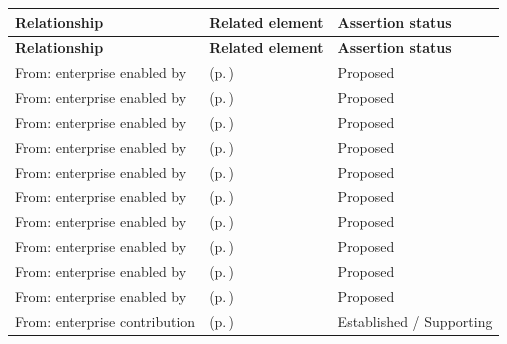 \begingroup\small\setlength{\TableWidth}{\dimexpr\linewidth-6\tabcolsep-4\arrayrulewidth\relax}
\begin{longtable}{|>{\raggedright\arraybackslash}p{0.27\TableWidth}|>{\raggedright\arraybackslash}p{0.48\TableWidth}|>{\raggedright\arraybackslash}p{0.25\TableWidth}|}
\hline\rowcolor{TableHead}\textbf{Relationship} & \textbf{Related element} & \textbf{Assertion status}\\\hline\endfirsthead
\hline\rowcolor{TableHead}\textbf{Relationship} & \textbf{Related element} & \textbf{Assertion status}\\\hline\endhead
\hline\endfoot
From: enterprise enabled by & \nameref{cap:bec-referral-administration} (p.\,\pageref{cap:bec-referral-administration}) & Proposed\\\hline
From: enterprise enabled by & \nameref{cap:bec-order-administration} (p.\,\pageref{cap:bec-order-administration}) & Proposed\\\hline
From: enterprise enabled by & \nameref{cap:bec-diagnostic-administration} (p.\,\pageref{cap:bec-diagnostic-administration}) & Proposed\\\hline
From: enterprise enabled by & \nameref{cap:bec-medication-administration} (p.\,\pageref{cap:bec-medication-administration}) & Proposed\\\hline
From: enterprise enabled by & \nameref{cap:bec-procedure-administration} (p.\,\pageref{cap:bec-procedure-administration}) & Proposed\\\hline
From: enterprise enabled by & \nameref{cap:bec-episode-encounter-administration} (p.\,\pageref{cap:bec-episode-encounter-administration}) & Proposed\\\hline
From: enterprise enabled by & \nameref{cap:bec-work-allocation-dispatch} (p.\,\pageref{cap:bec-work-allocation-dispatch}) & Proposed\\\hline
From: enterprise enabled by & \nameref{cap:bec-patient-transport} (p.\,\pageref{cap:bec-patient-transport}) & Proposed\\\hline
From: enterprise enabled by & \nameref{cap:bec-clinical-logistics-coordination} (p.\,\pageref{cap:bec-clinical-logistics-coordination}) & Proposed\\\hline
From: enterprise enabled by & \nameref{cap:bec-discharge-management} (p.\,\pageref{cap:bec-discharge-management}) & Proposed\\\hline
From: enterprise contribution & \nameref{cap:bec-assurance-design} (p.\,\pageref{cap:bec-assurance-design}) & Established / Supporting\\\hline
\end{longtable}\endgroup


